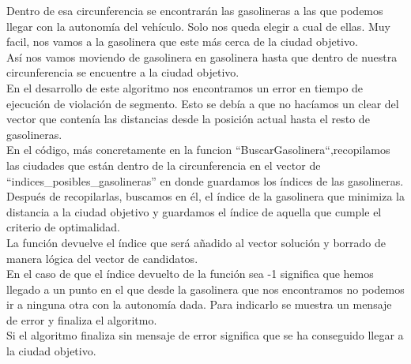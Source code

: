 \documentclass[11pt,a4paper]{article} %
\begin{document}
Dentro de esa circunferencia se encontrarán las gasolineras a las que podemos llegar con la autonomía del vehículo. Solo nos queda elegir a cual de ellas. Muy facil, nos vamos a la gasolinera que este más cerca de la ciudad objetivo. \\

Así nos vamos moviendo de gasolinera en gasolinera hasta que dentro de nuestra circunferencia se encuentre a la ciudad objetivo.\\

En el desarrollo de este algoritmo nos encontramos un error en tiempo de ejecución de violación de segmento. Esto se debía a que no hacíamos un clear del vector que contenía las distancias desde la posición actual hasta el resto de gasolineras.\\

En el código, más concretamente en la funcion “BuscarGasolinera“,recopilamos las ciudades que están dentro de la circunferencia en el vector de “indices\_posibles\_gasolineras” en donde guardamos los índices de las gasolineras.\\

Después de recopilarlas, buscamos en él, el índice de la gasolinera que minimiza la distancia a la ciudad objetivo y guardamos el índice de aquella que cumple el criterio de optimalidad.\\

La función devuelve el índice que será añadido al vector solución y borrado de manera lógica del vector de candidatos.\\

En el caso de que el índice devuelto de la función sea -1 significa que hemos llegado a un punto en el que desde la gasolinera que nos encontramos no podemos ir a ninguna otra con la autonomía dada. Para indicarlo se muestra un mensaje de error y finaliza el algoritmo.\\

Si el algoritmo finaliza sin mensaje de error significa que se ha conseguido llegar a la ciudad objetivo.\\
\end{document}
